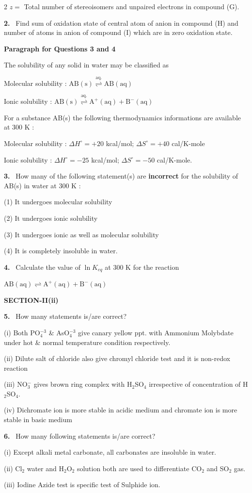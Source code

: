 \documentclass[10pt]{extarticle}
\newcommand{\sect}[1]{\par\smallskip\noindent\textbf{#1}\par}
\newcommand{\qn}[1]{\par\smallskip\noindent\textbf{#1.}~}
\newcommand{\paraq}[2]{\par\smallskip\noindent\textbf{Paragraph for Questions #1 and #2}\par}
\begin{document}
\begin{multicols}{2}
$z=$ Total number of stereoisomers and unpaired electrons in compound (G).
\qn{2} Find sum of oxidation state of central atom of anion in compound (H) and number of atoms in anion of compound (I) which are in zero oxidation state.
\paraq{3}{4}
The solubility of any solid in water may be classified as

Molecular solubility : $\mathrm{AB(s)}\overset{\mathrm{aq.}}{\rightleftharpoons}\mathrm{AB(aq)}$

Ionic solubility : $\mathrm{AB(s)}\overset{\mathrm{aq.}}{\rightleftharpoons}\mathrm{A^+(aq)+B^-(aq)}$

For a substance AB(s) the following thermodynamics informations are available at 300 K :

Molecular solubility : $\Delta H^\circ=+20$ kcal/mol; $\Delta S^\circ=+40$ cal/K-mole

Ionic solubility : $\Delta H^\circ=-25$ kcal/mol; $\Delta S^\circ=-50$ cal/K-mole.
\qn{3} How many of the following statement(s) are \textbf{incorrect} for the solubility of AB(s) in water at 300 K :

(1) It undergoes molecular solubility

(2) It undergoes ionic solubility

(3) It undergoes ionic as well as molecular solubility

(4) It is completely insoluble in water.
\qn{4} Calculate the value of $\ln K_{eq}$ at 300 K for the reaction

$\mathrm{AB(aq)\rightleftharpoons A^+(aq)+B^-(aq)}$
\sect{SECTION-II(ii)}
\qn{5} How many statements is/are correct?

(i) Both PO$_4^{-3}$ \& AsO$_4^{-3}$ give canary yellow ppt. with Ammonium Molybdate under hot \& normal temperature condition respectively.

(ii) Dilute salt of chloride also give chromyl chloride test and it is non-redox reaction

(iii) NO$_3^-$ gives brown ring complex with H$_2$SO$_4$ irrespective of concentration of H$_2$SO$_4$.

(iv) Dichromate ion is more stable in acidic medium and chromate ion is more stable in basic medium
\qn{6} How many following statements is/are correct?

(i) Except alkali metal carbonate, all carbonates are insoluble in water.

(ii) Cl$_2$ water and H$_2$O$_2$ solution both are used to differentiate CO$_2$ and SO$_2$ gas.

(iii) Iodine Azide test is specific test of Sulphide ion.


\end{multicols}
\end{document}
